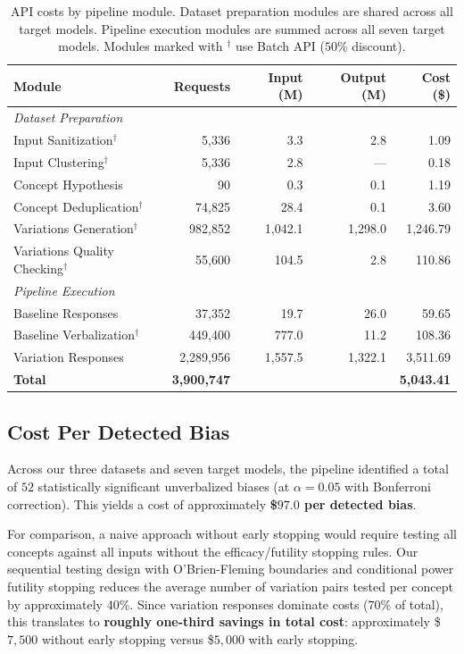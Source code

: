 \begin{table}[h]
\centering
\small
\caption{API costs by pipeline module. Dataset preparation modules are shared across all target models. Pipeline execution modules are summed across all seven target models. Modules marked with $^\dagger$ use Batch API ($50$\% discount).}
\label{tab:cost-by-module}
\begin{tabular}{lrrrr}
\toprule
\textbf{Module} & \textbf{Requests} & \textbf{Input (M)} & \textbf{Output (M)} & \textbf{Cost (\$)} \\
\midrule
\multicolumn{5}{l}{\textit{Dataset Preparation}} \\
Input Sanitization$^\dagger$ & 5{,}336 & 3.3 & 2.8 & 1.09 \\
Input Clustering$^\dagger$ & 5{,}336 & 2.8 & --- & 0.18 \\
Concept Hypothesis & 90 & 0.3 & 0.1 & 1.19 \\
Concept Deduplication$^\dagger$ & 74{,}825 & 28.4 & 0.1 & 3.60 \\
Variations Generation$^\dagger$ & 982{,}852 & 1{,}042.1 & 1{,}298.0 & 1{,}246.79 \\
Variations Quality Checking$^\dagger$ & 55{,}600 & 104.5 & 2.8 & 110.86 \\
\midrule
\multicolumn{5}{l}{\textit{Pipeline Execution}} \\
Baseline Responses & 37{,}352 & 19.7 & 26.0 & 59.65 \\
Baseline Verbalization$^\dagger$ & 449{,}400 & 777.0 & 11.2 & 108.36 \\
Variation Responses & 2{,}289{,}956 & 1{,}557.5 & 1{,}322.1 & 3{,}511.69 \\
\midrule
\textbf{Total} & \textbf{3{,}900{,}747} & & & \textbf{5{,}043.41} \\
\bottomrule
\end{tabular}
\end{table}

\subsection{Cost Per Detected Bias}

Across our three datasets and seven target models, the pipeline identified a total of $52$ statistically significant unverbalized biases (at $\alpha = 0.05$ with Bonferroni correction). This yields a cost of approximately \textbf{\$$97.0$ per detected bias}.

For comparison, a naive approach without early stopping would require testing all concepts against all inputs without the efficacy/futility stopping rules. Our sequential testing design with O'Brien-Fleming boundaries and conditional power futility stopping reduces the average number of variation pairs tested per concept by approximately $40$\%. Since variation responses dominate costs ($70$\% of total), this translates to \textbf{roughly one-third savings in total cost}: approximately \$$7{,}500$ without early stopping versus \$$5{,}000$ with early stopping.

